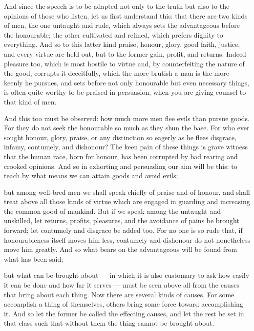  And since the speech is to be adapted not only to the truth but also to the opinions of those who listen, let us first understand this: that there are two kinds of men, the one untaught and rude, which always sets the advantageous before the honourable; the other cultivated and refined, which prefers dignity to everything. And so to this latter kind praise, honour, glory, good faith, justice, and every virtue are held out, but to the former gain, profit, and returns. Indeed pleasure too, which is most hostile to virtue and, by counterfeiting the nature of the good, corrupts it deceitfully, which the more brutish a man is the more keenly he pursues, and sets before not only honourable but even necessary things, is often quite worthy to be praised in persuasion, when you are giving counsel to that kind of men.

 And this too must be observed: how much more men flee evils than pursue goods. For they do not seek the honourable so much as they shun the base. For who ever sought honour, glory, praise, or any distinction so eagerly as he flees disgrace, infamy, contumely, and dishonour? The keen pain of these things is grave witness that the human race, born for honour, has been corrupted by bad rearing and crooked opinions. And so in exhorting and persuading our aim will be this: to teach by what means we can attain goods and avoid evils;

 but among well-bred men we shall speak chiefly of praise and of honour, and shall treat above all those kinds of virtue which are engaged in guarding and increasing the common good of mankind. But if we speak among the untaught and unskilled, let returns, profits, pleasures, and the avoidance of pains be brought forward; let contumely and disgrace be added too. For no one is so rude that, if honourableness itself moves him less, contumely and dishonour do not nonetheless move him greatly. And so what bears on the advantageous will be found from what has been said;

 but what can be brought about — in which it is also customary to ask how easily it can be done and how far it serves — must be seen above all from the causes that bring about each thing. Now there are several kinds of causes. For some accomplish a thing of themselves, others bring some force toward accomplishing it. And so let the former be called the effecting causes, and let the rest be set in that class such that without them the thing cannot be brought about.

